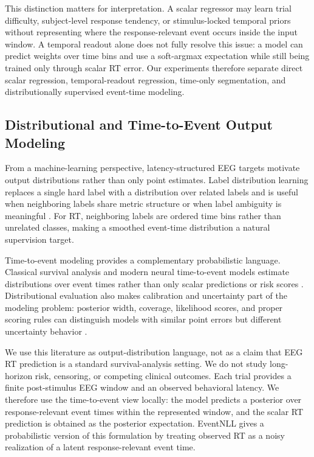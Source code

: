 This distinction matters for interpretation. A scalar regressor may learn trial difficulty, subject-level response tendency, or stimulus-locked temporal priors without representing where the response-relevant event occurs inside the input window. A temporal readout alone does not fully resolve this issue: a model can predict weights over time bins and use a soft-argmax expectation while still being trained only through scalar RT error. Our experiments therefore separate direct scalar regression, temporal-readout regression, time-only segmentation, and distributionally supervised event-time modeling.

\subsection{Distributional and Time-to-Event Output Modeling}

From a machine-learning perspective, latency-structured EEG targets motivate output distributions rather than only point estimates. Label distribution learning replaces a single hard label with a distribution over related labels and is useful when neighboring labels share metric structure or when label ambiguity is meaningful \citep{Geng2016}. For RT, neighboring labels are ordered time bins rather than unrelated classes, making a smoothed event-time distribution a natural supervision target.

Time-to-event modeling provides a complementary probabilistic language. Classical survival analysis and modern neural time-to-event models estimate distributions over event times rather than only scalar predictions or risk scores \citep{Cox1972,Lee2018}. Distributional evaluation also makes calibration and uncertainty part of the modeling problem: posterior width, coverage, likelihood scores, and proper scoring rules can distinguish models with similar point errors but different uncertainty behavior \citep{Haider2020,Chapfuwa2023}.

We use this literature as output-distribution language, not as a claim that EEG RT prediction is a standard survival-analysis setting. We do not study long-horizon risk, censoring, or competing clinical outcomes. Each trial provides a finite post-stimulus EEG window and an observed behavioral latency. We therefore use the time-to-event view locally: the model predicts a posterior over response-relevant event times within the represented window, and the scalar RT prediction is obtained as the posterior expectation. EventNLL gives a probabilistic version of this formulation by treating observed RT as a noisy realization of a latent response-relevant event time.

